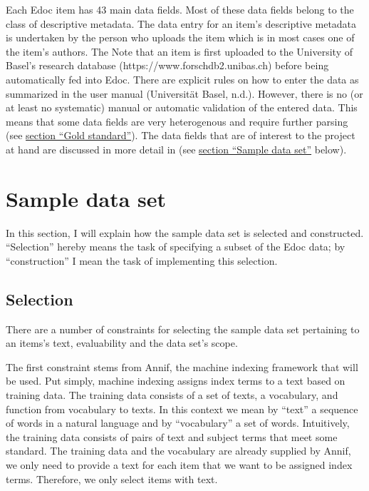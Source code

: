 Each Edoc item has 43 main data fields. Most of these data fields belong
to the class of descriptive metadata. The data entry for an item's
descriptive metadata is undertaken by the person who uploads the item
which is in most cases one of the item's authors. The Note that an item
is first uploaded to the University of Basel's research database
(https://www.forschdb2.unibas.ch) before being automatically fed into
Edoc. There are explicit rules on how to enter the data as summarized in
the user manual (Universität Basel, n.d.). However, there is no (or at
least no systematic) manual or automatic validation of the entered data.
This means that some data fields are very heterogenous and require
further parsing (see \protect\hyperlink{gold-standard}{section ``Gold
standard''}). The data fields that are of interest to the project at
hand are discussed in more detail in (see
\protect\hyperlink{sample-data-set}{section ``Sample data set''} below).

\hypertarget{sample-data-set}{%
\section{Sample data set}\label{sample-data-set}}

In this section, I will explain how the sample data set is selected and
constructed. ``Selection'' hereby means the task of specifying a subset
of the Edoc data; by ``construction'' I mean the task of implementing
this selection.

\hypertarget{selection}{%
\subsection{Selection}\label{selection}}

There are a number of constraints for selecting the sample data set
pertaining to an items's text, evaluability and the data set's scope.

The first constraint stems from Annif, the machine indexing framework
that will be used. Put simply, machine indexing assigns index terms to a
text based on training data. The training data consists of a set of
texts, a vocabulary, and function from vocabulary to texts. In this
context we mean by ``text'' a sequence of words in a natural language
and by ``vocabulary'' a set of words. Intuitively, the training data
consists of pairs of text and subject terms that meet some standard. The
training data and the vocabulary are already supplied by Annif, we only
need to provide a text for each item that we want to be assigned index
terms. Therefore, we only select items with text.

